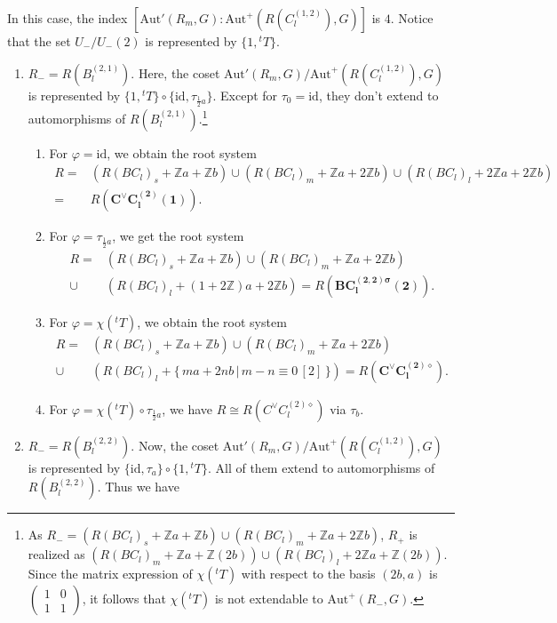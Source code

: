 \documentclass[11pt]{amsart}
\newcommand{\Z}{\mathbb{Z}}
\newcommand{\Aut}{\mathrm{Aut}}
\newcommand{\id}{\mathrm{id}}
\begin{document}
In this case, the index $[\Aut'(R_m,G):\Aut^+(R(C_l^{(1,2)}),G)]$ is $4$. 
Notice that the set $U_-/U_-(2)$ is represented by $\{ 1, {}^tT\}$.  
\begin{enumerate}
\item[(I)] $R_-=R(B_l^{(2,1)})$. Here, the coset $\Aut'(R_m,G)/\Aut^+(R(C_l^{(1,2)}),G)$ is represented by $\{1, {}^tT \} \circ \{ \id, \tau_{\frac{1}{2}a} \}$. Except for $\tau_0=\id$,  they don't extend to automorphisms of $R(B_l^{(2,1)})$.\footnote{As $R_-=(R(BC_l)_s+\Z a+\Z b) \cup (R(BC_l)_m+\Z a+2\Z b)$, $R_+$ is realized as $(R(BC_l)_m+\Z a+\Z(2b)) \cup (R(BC_l)_l+2\Z a+\Z(2b))$. Since the matrix expression of $\chi({}^tT)$ with respect to the basis $(2b,a)$ is $\begin{pmatrix} 1 & 0 \\ 1 & 1\end{pmatrix}$, it follows that $\chi({}^tT)$ is not extendable to $\Aut^+(R_-,G)$.}
\begin{enumerate}
\item[(i)] For $\varphi=\id$, we obtain the root system
\begin{align*}
R=
&(R(BC_l)_s+\Z a+\Z b) \cup (R(BC_l)_m+\Z a+2\Z b) \cup (R(BC_l)_l+2\Z a+2\Z b) \\
=
&R(\mathbf{C^\vee C_l^{(2)}(1)}).
\end{align*}
\item[(ii)] For $\varphi=\tau_{\frac{1}{2}a}$, we get the root system
\begin{align*}
R=
&(R(BC_l)_s+\Z a+\Z b) \cup (R(BC_l)_m+\Z a+2\Z b) \\
\cup 
&(R(BC_l)_l+(1+2\Z) a+2\Z b)= R(\mathbf{BC_l^{(2,2)\sigma}(2)}).
\end{align*}
\item[(iii)] For $\varphi=\chi({}^tT)$, we obtain the root system
\begin{align*}
R=
&(R(BC_l)_s+\Z a+\Z b) \cup (R(BC_l)_m+\Z a+2\Z b) \\
\cup 
&(R(BC_l)_l+\{\, ma+2nb\, \vert\, m-n \equiv 0\, [2]\,\})=R(\mathbf{C^\vee C_l^{(2)\diamond}}).
\end{align*}
\item[(iv)] For $\varphi=\chi({}^tT)\circ \tau_{\frac{1}{2}a}$, we have $R \cong R(C^\vee C_l^{(2)\diamond})$ via $\tau_b$.
\end{enumerate}
\item[(II)] $R_-=R(B_l^{(2,2)})$.  Now, the coset $\Aut'(R_m,G)/\Aut^+(R(C_l^{(1,2)}),G)$ is represented by $\{ \id, \tau_{a} \} \circ \{1,  {}^tT \}$.  All of them extend to automorphisms of $R(B_l^{(2,2)})$. Thus we have

\end{enumerate}
\end{document}

